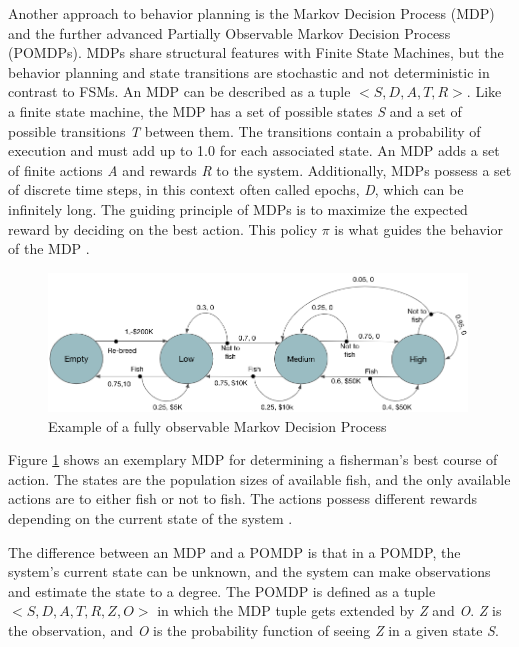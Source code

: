 Another approach to behavior planning is the Markov Decision Process (MDP) and the further advanced Partially Observable Markov Decision Process (POMDPs). MDPs share structural features with Finite State Machines, but the behavior planning and state transitions are stochastic and not deterministic in contrast to FSMs. An MDP can be described as a tuple $<S, D, A, T, R>$. Like a finite state machine, the MDP has a set of possible states \textit{S} and a set of possible transitions \textit{T} between them. The transitions contain a probability of execution and must add up to 1.0 for each associated state. An MDP adds a set of finite actions \textit{A} and rewards \textit{R} to the system. Additionally, MDPs possess a set of discrete time steps, in this context often called epochs, \textit{D}, which can be infinitely long. The guiding principle of MDPs is to maximize the expected reward by deciding on the best action. This policy $\pi$ is what guides the behavior of the MDP \cite{feyzabadi2014riskaware}.

\begin{figure}[ht]
	\centering
	\includegraphics[width=0.99\textwidth]{images/mdp.png} 
	\caption{Example of a fully observable Markov Decision Process \cite{andrew1999reinforcement, banerjee2021real}}
	\label{fig:mdp}
\end{figure}

Figure \ref{fig:mdp} shows an exemplary MDP for determining a fisherman's best course of action. The states are the population sizes of available fish, and the only available actions are to either fish or not to fish. The actions possess different rewards depending on the current state of the system \cite{tanwar2019markov}. 

The difference between an MDP and a POMDP is that in a POMDP, the system's current state can be unknown, and the system can make observations and estimate the state to a degree. The POMDP is defined as a tuple $<S, D, A, T, R, Z, O>$ in which the MDP tuple gets extended by \textit{Z} and \textit{O}. \textit{Z} is the observation, and \textit{O} is the probability function of seeing \textit{Z} in a given state \textit{S}.

